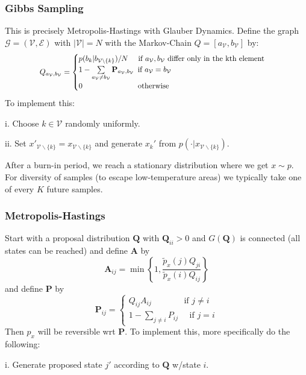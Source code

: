 \documentclass[9pt]{article}
\begin{document}
\begin{multicols}{2}
\subsubsection{Gibbs Sampling}

This is precisely Metropolis-Hastings with Glauber Dynamics. 
Define the graph $\mathcal{G}=(\mathcal{V},\mathcal{E})$ with 
$|\mathcal{V}|=N$ with the Markov-Chain $Q=[a_{\mathcal{V}},b_{\mathcal{V}}]$ by:
\[
\scalebox{0.9}{
\(Q_{a_{\mathcal{V}},b_{\mathcal{V}}}= \begin{cases} p(b_k|b_{\mathcal{V}\backslash\{k\}}) / N \quad \text{ if } a_{\mathcal{V}}, b_{\mathcal{V}} \text{ differ only in the kth element} \\ 
1-\sum\limits_{a_{\mathcal{V}} \ne b_{\mathcal{V}}} \mathbf{P}_{a_{\mathcal{V}}, b_{\mathcal{V}}} \enspace \text{if } a_{\mathcal{V}} = b_{\mathcal{V}}
\\
0 \quad \quad \quad \quad \quad \quad \quad
\text{ otherwise}
\end{cases}\)
}
\]
To implement this: 

i. Choose $k \in \mathcal{V}$ randomly uniformly.

ii. Set $x'_{\mathcal{V} \backslash \{k\}}=x_{\mathcal{V} \backslash \{k\}}$ and generate $x_k'$ from $p(\cdot | x_{\mathcal{V} \backslash \{k\}})$. 

After a burn-in period, we reach a stationary distribution where
we get $x \sim p$. For diversity of samples (to escape low-temperature areas) we typically take one of every $K$ future samples. 

\subsubsection{Metropolis-Hastings}

Start with a proposal distribution $\mathbf{Q}$ with $\mathbf{Q}_{ii} > 0$ and $G(\mathbf{Q})$ is connected (all states
can be reached) and define $\mathbf{A}$ by
$$\mathbf{A}_{ij}=\min\left\{1, \frac{\tilde{p}_x(j)Q_{ji}}{\tilde{p}_x(i)Q_{ij}}\right\}$$ and define $\mathbf{P}$ by
$$\mathbf{P}_{ij}=\begin{cases} Q_{ij}A_{ij} \quad\quad\quad\enspace \text { if } j \ne i \\
1 - \sum_{j \ne i}P_{ij} \quad \text { if } j = i\end{cases}$$
Then $p_{x}$ will be reversible wrt $\mathbf{P}$. To implement this,
more specifically do the following:

i. Generate proposed state $j'$ according to $\mathbf{Q}$ w/state $i$.


\end{multicols}
\end{document}
